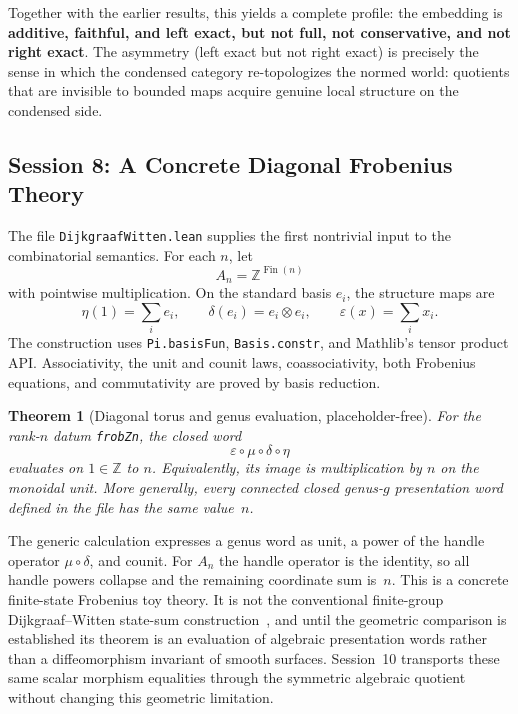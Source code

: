 \documentclass[11pt]{amsart}
\theoremstyle{plain}
\newtheorem{theorem}{Theorem}[section]
\theoremstyle{definition}
\begin{document}
Together with the earlier results, this yields a complete profile: the embedding is \textbf{additive, faithful, and left exact, but not full, not conservative, and not right exact}. The asymmetry (left exact but not right exact) is precisely the sense in which the condensed category re-topologizes the normed world: quotients that are invisible to bounded maps acquire genuine local structure on the condensed side.

\subsection{Session 8: A Concrete Diagonal Frobenius Theory}

The file \texttt{DijkgraafWitten.lean} supplies the first nontrivial input to the combinatorial semantics. For each $n$, let
\[
A_n = \mathbb{Z}^{\operatorname{Fin}(n)}
\]
with pointwise multiplication. On the standard basis $e_i$, the structure maps are
\[
\eta(1)=\sum_i e_i, \qquad
\delta(e_i)=e_i\otimes e_i, \qquad
\varepsilon(x)=\sum_i x_i .
\]
The construction uses \texttt{Pi.basisFun}, \texttt{Basis.constr}, and Mathlib's tensor product API. Associativity, the unit and counit laws, coassociativity, both Frobenius equations, and commutativity are proved by basis reduction.

\begin{theorem}[Diagonal torus and genus evaluation, placeholder-free]
For the rank-$n$ datum \texttt{frobZn}, the closed word
\[
\varepsilon\circ\mu\circ\delta\circ\eta
\]
evaluates on $1\in\mathbb{Z}$ to $n$. Equivalently, its image is multiplication by $n$ on the monoidal unit. More generally, every connected closed genus-$g$ presentation word defined in the file has the same value~$n$.
\end{theorem}

The generic calculation expresses a genus word as unit, a power of the handle operator $\mu\circ\delta$, and counit. For $A_n$ the handle operator is the identity, so all handle powers collapse and the remaining coordinate sum is~$n$. This is a concrete finite-state Frobenius toy theory. It is not the conventional finite-group Dijkgraaf--Witten state-sum construction~\cite{DijkgraafWitten1990}, and until the geometric comparison is established its theorem is an evaluation of algebraic presentation words rather than a diffeomorphism invariant of smooth surfaces. Session~10 transports these same scalar morphism equalities through the symmetric algebraic quotient without changing this geometric limitation.
\end{document}
